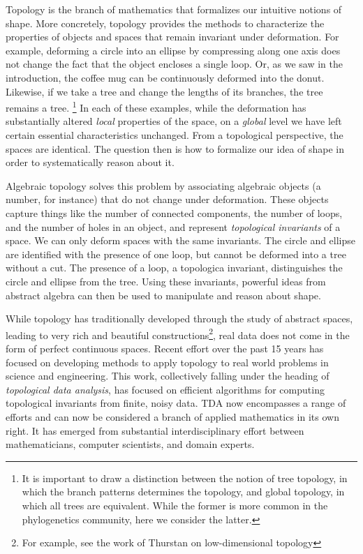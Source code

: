 Topology is the branch of mathematics that formalizes our intuitive notions of shape.
More concretely, topology provides the methods to characterize the properties of objects and spaces that remain invariant under deformation.
For example, deforming a circle into an ellipse by compressing along one axis does not change the fact that the object encloses a single loop.
Or, as we saw in the introduction, the coffee mug can be continuously deformed into the donut.
Likewise, if we take a tree and change the lengths of its branches, the tree remains a tree.
\footnote{It is important to draw a distinction between the notion of tree topology, in which the branch patterns determines the topology, and global topology, in which all trees are equivalent. While the former is more common in the phylogenetics community, here we consider the latter.}
In each of these examples, while the deformation has substantially altered \emph{local} properties of the space, on a \emph{global} level we have left certain essential characteristics unchanged.
From a topological perspective, the spaces are identical.
The question then is how to formalize our idea of shape in order to systematically reason about it.

Algebraic topology solves this problem by associating algebraic objects (a number, for instance) that do not change under deformation.
These objects capture things like the number of connected components, the number of loops, and the number of holes in an object, and represent \emph{topological invariants} of a space.
We can only deform spaces with the same invariants.
The circle and ellipse are identified with the presence of one loop, but cannot be deformed into a tree without a cut.
The presence of a loop, a topologica invariant, distinguishes the circle and ellipse from the tree.
Using these invariants, powerful ideas from abstract algebra can then be used to manipulate and reason about shape.

While topology has traditionally developed through the study of abstract spaces, leading to very rich and beautiful constructions\footnote{For example, see the work of Thurstan on low-dimensional topology}, real data does not come in the form of perfect continuous spaces.
Recent effort over the past 15 years has focused on developing methods to apply topology to real world problems in science and engineering.
This work, collectively falling under the heading of \emph{topological data analysis}, has focused on efficient algorithms for computing topological invariants from finite, noisy data.
TDA now encompasses a range of efforts and can now be considered a branch of applied mathematics in its own right.
It has emerged from substantial interdisciplinary effort between mathematicians, computer scientists, and domain experts.

